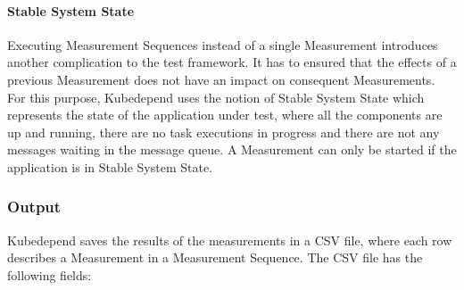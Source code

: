 \paragraph{Stable System State} Executing Measurement Sequences instead of a single Measurement introduces another complication to the test framework. It has to ensured that the effects of a previous Measurement does not have an impact on consequent Measurements. For this purpose, Kubedepend uses the notion of Stable System State which represents the state of the application under test, where all the components are up and running, there are no task executions in progress and there are not any messages waiting in the message queue. A Measurement can only be started if the application is in Stable System State.

\subsubsection{Output} \label{test-impl-kubedepend-output}

Kubedepend saves the results of the measurements in a CSV file, where each row describes a Measurement in a Measurement Sequence. The CSV file has the following fields:

